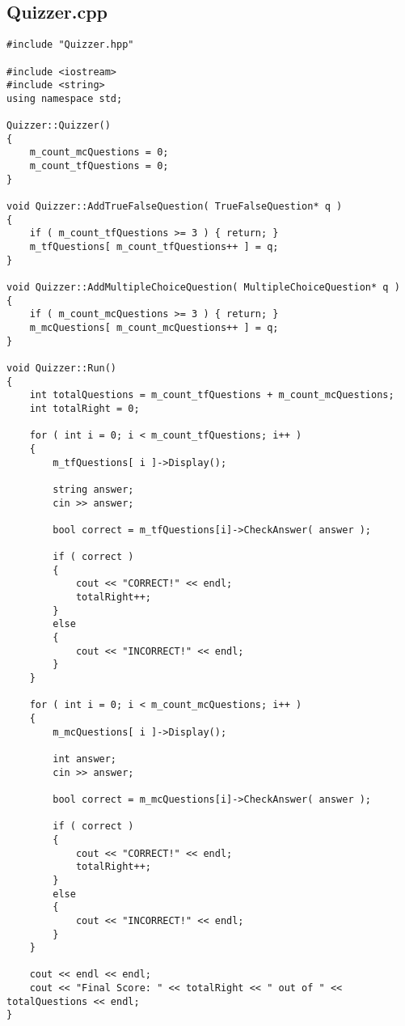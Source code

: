 \documentclass[a4paper,12pt]{book}
\begin{document}
            
            \subsection*{Quizzer.cpp}
\begin{lstlisting}[style=code]
#include "Quizzer.hpp"

#include <iostream>
#include <string>
using namespace std;

Quizzer::Quizzer()
{
    m_count_mcQuestions = 0;
    m_count_tfQuestions = 0;
}

void Quizzer::AddTrueFalseQuestion( TrueFalseQuestion* q )
{
    if ( m_count_tfQuestions >= 3 ) { return; }
    m_tfQuestions[ m_count_tfQuestions++ ] = q;
}

void Quizzer::AddMultipleChoiceQuestion( MultipleChoiceQuestion* q )
{
    if ( m_count_mcQuestions >= 3 ) { return; }
    m_mcQuestions[ m_count_mcQuestions++ ] = q;
}

void Quizzer::Run()
{
    int totalQuestions = m_count_tfQuestions + m_count_mcQuestions;
    int totalRight = 0;

    for ( int i = 0; i < m_count_tfQuestions; i++ )
    {
        m_tfQuestions[ i ]->Display();

        string answer;
        cin >> answer;

        bool correct = m_tfQuestions[i]->CheckAnswer( answer );

        if ( correct )
        {
            cout << "CORRECT!" << endl;
            totalRight++;
        }
        else
        {
            cout << "INCORRECT!" << endl;
        }
    }

    for ( int i = 0; i < m_count_mcQuestions; i++ )
    {
        m_mcQuestions[ i ]->Display();

        int answer;
        cin >> answer;

        bool correct = m_mcQuestions[i]->CheckAnswer( answer );

        if ( correct )
        {
            cout << "CORRECT!" << endl;
            totalRight++;
        }
        else
        {
            cout << "INCORRECT!" << endl;
        }
    }

    cout << endl << endl;
    cout << "Final Score: " << totalRight << " out of " << totalQuestions << endl;
}
\end{lstlisting}

            \newpage                    
\end{document}
